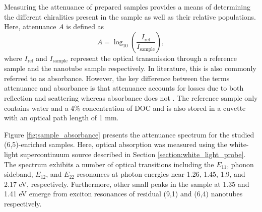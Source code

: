 Measuring the attenuance of prepared samples provides a means of determining the different chiralities present in the sample as well as their relative populations. Here, attenuance $A$ is defined as
\begin{equation}
A = \log_{10}\left(\dfrac{I_{\mathrm{ref}}}{I_{\mathrm{sample}}}\right),
\end{equation}
where $I_{\mathrm{ref}}$ and $I_{\mathrm{sample}}$ represent the optical transmission through a reference sample and the nanotube sample respectively. In literature, this is also commonly referred to as absorbance. However, the key difference between the terms attenuance and absorbance is that attenuance accounts for losses due to both reflection and scattering whereas absorbance does not \cite{dixon1992absorbance}. The reference sample only contains water and a 4\% concentration of DOC and is also stored in a cuvette with an optical path length of 1 mm.

Figure \ref{fig:sample_absorbance} presents the attenuance spectrum for the studied (6,5)-enriched samples. Here, optical absorption was measured using the white-light supercontinuum source described in Section \ref{section:white_light_probe}. The spectrum exhibits a number of optical transitions including the $E_{11}$, phonon sideband, $E_{12}$, and $E_{22}$ resonances at photon energies near 1.26, 1.45, 1.9, and 2.17 eV, respectively. Furthermore, other small peaks in the sample at 1.35 and 1.41 eV emerge from exciton resonances of residual (9,1) and (6,4) nanotubes respectively.

